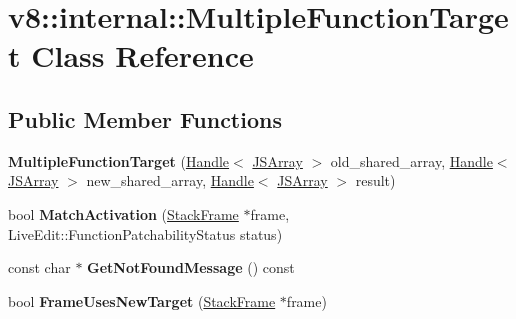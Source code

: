 \hypertarget{classv8_1_1internal_1_1_multiple_function_target}{}\section{v8\+:\+:internal\+:\+:Multiple\+Function\+Target Class Reference}
\label{classv8_1_1internal_1_1_multiple_function_target}
\subsection*{Public Member Functions}
\begin{DoxyCompactItemize}
\item 
{\bfseries Multiple\+Function\+Target} (\hyperlink{classv8_1_1internal_1_1_handle}{Handle}$<$ \hyperlink{classv8_1_1internal_1_1_j_s_array}{J\+S\+Array} $>$ old\+\_\+shared\+\_\+array, \hyperlink{classv8_1_1internal_1_1_handle}{Handle}$<$ \hyperlink{classv8_1_1internal_1_1_j_s_array}{J\+S\+Array} $>$ new\+\_\+shared\+\_\+array, \hyperlink{classv8_1_1internal_1_1_handle}{Handle}$<$ \hyperlink{classv8_1_1internal_1_1_j_s_array}{J\+S\+Array} $>$ result)\hypertarget{classv8_1_1internal_1_1_multiple_function_target_aea61125af6633a6fab4b2993f85a6d47}{}\label{classv8_1_1internal_1_1_multiple_function_target_aea61125af6633a6fab4b2993f85a6d47}

\item 
bool {\bfseries Match\+Activation} (\hyperlink{classv8_1_1_stack_frame}{Stack\+Frame} $\ast$frame, Live\+Edit\+::\+Function\+Patchability\+Status status)\hypertarget{classv8_1_1internal_1_1_multiple_function_target_a5a201cd0c25b89209238eb2504ce279c}{}\label{classv8_1_1internal_1_1_multiple_function_target_a5a201cd0c25b89209238eb2504ce279c}

\item 
const char $\ast$ {\bfseries Get\+Not\+Found\+Message} () const \hypertarget{classv8_1_1internal_1_1_multiple_function_target_aaba514129e81f040a01585274ba28338}{}\label{classv8_1_1internal_1_1_multiple_function_target_aaba514129e81f040a01585274ba28338}

\item 
bool {\bfseries Frame\+Uses\+New\+Target} (\hyperlink{classv8_1_1_stack_frame}{Stack\+Frame} $\ast$frame)\hypertarget{classv8_1_1internal_1_1_multiple_function_target_a327af3cd3b96c4574dcbbfb505b8e0cb}{}\label{classv8_1_1internal_1_1_multiple_function_target_a327af3cd3b96c4574dcbbfb505b8e0cb}

\end{DoxyCompactItemize}
